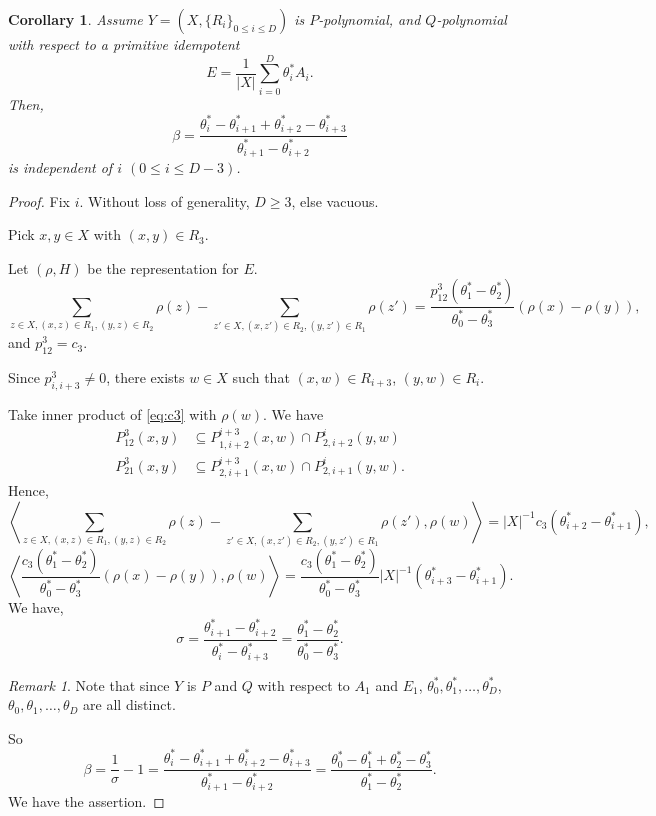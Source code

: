 \documentclass[
]{book}
\newtheorem{corollary}{Corollary}[chapter]
\theoremstyle{definition}
\theoremstyle{definition}
\theoremstyle{definition}
\theoremstyle{definition}
\theoremstyle{remark}
\newtheorem*{remark}{Remark}
\begin{document}
\begin{corollary}
\protect\hypertarget{cor:beta}{}\label{cor:beta}Assume \(Y = (X, \{R_i\}_{0\leq i\leq D})\) is \(P\)-polynomial, and \(Q\)-polynomial with respect to a primitive idempotent
\[E = \frac{1}{|X|}\sum_{i=0}^D \theta^*_i A_i.\]
Then,
\[\beta = \frac{\theta^*_i - \theta^*_{i+1} + \theta^*_{i+2}-\theta^*_{i+3}}{\theta^*_{i+1}-\theta^*_{i+2}}\]
is independent of \(i\) \((0\leq i\leq D-3)\).
\end{corollary}

\begin{proof}
Fix \(i\). Without loss of generality, \(D\geq 3\), else vacuous.

Pick \(x,y\in X\) with \((x,y)\in R_3\).

Let \((\rho, H)\) be the representation for \(E\).
\begin{equation}
\sum_{z\in X, (x,z)\in R_1, (y,z)\in R_2}\rho(z) - \sum_{z'\in X, (x,z')\in R_2, (y,z')\in R_1}\rho(z') = \frac{p^3_{12}(\theta^*_1-\theta^*_2)}{\theta^*_0-\theta^*_3}(\rho(x)-\rho(y)), \label{eq:c3}
\end{equation}
and \(p^3_{12} = c_3\).

Since \(p^3_{i,i+3} \neq 0\), there exists \(w\in X\) such that \((x,w)\in R_{i+3}\), \((y,w) \in R_i\).

Take inner product of \eqref{eq:c3} with \(\rho(w)\). We have
\begin{align}
P^3_{12}(x,y) & \subseteq P^{i+3}_{1,i+2}(x,w)\cap P^i_{2,i+2}(y,w)\\
P^3_{21}(x,y) & \subseteq P^{i+3}_{2,i+1}(x,w)\cap P^i_{2,i+1}(y,w).
\end{align}
Hence,
\[\left\langle \sum_{z\in X, (x,z)\in R_1, (y,z)\in R_2}\rho(z) - \sum_{z'\in X, (x,z')\in R_2, (y,z')\in R_1}\rho(z'), \rho(w)\right\rangle = |X|^{-1}c_3(\theta^*_{i+2}-\theta^*_{i+1}),\]
\[\left\langle \frac{c_3(\theta^*_1-\theta^*_2)}{\theta^*_0-\theta^*_3}(\rho(x)-\rho(y)), \rho(w)\right\rangle = \frac{c_3(\theta^*_1-\theta^*_2)}{\theta^*_0-\theta^*_3}|X|^{-1}(\theta^*_{i+3}-\theta^*_{i+1}).\]
We have,
\[\sigma = \frac{\theta^*_{i+1}-\theta^*_{i+2}}{\theta^*_i-\theta^*_{i+3}} = \frac{\theta^*_1-\theta^*_2}{\theta^*_0-\theta^*_3}.\]

\begin{remark}
Note that since \(Y\) is \(P\) and \(Q\) with respect to \(A_1\) and \(E_1\), \(\theta^*_0, \theta^*_1, \ldots, \theta^*_D\), \(\theta_0, \theta_1, \ldots, \theta_D\) are all distinct.
\end{remark}

So
\[\beta = \frac{1}{\sigma}-1 = \frac{\theta^*_i - \theta^*_{i+1} + \theta^*_{i+2}-\theta^*_{i+3}}{\theta^*_{i+1}-\theta^*_{i+2}} = \frac{\theta^*_0 - \theta^*_{1} + \theta^*_{2}-\theta^*_{3}}{\theta^*_{1}-\theta^*_{2}}.\]
We have the assertion.
\end{proof}
\end{document}
